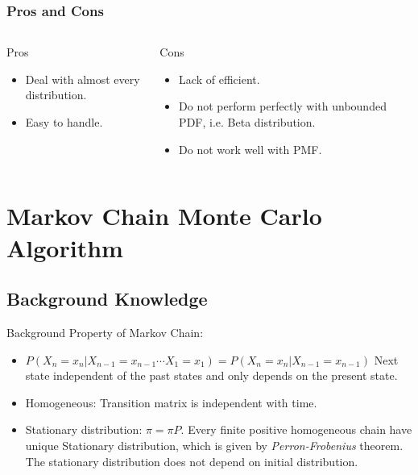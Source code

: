 \begin{frame}
    \frametitle{Pros and Cons}
    \begin{columns}
        \begin{block}{Pros}
            \begin{itemize}
                \item Deal with almost every distribution.
                \item Easy to handle.
            \end{itemize}
        \end{block}
        
        \begin{block}{Cons}
            \begin{itemize}
                \item Lack of efficient.
                \item Do not perform perfectly with unbounded PDF, i.e. Beta distribution.
                \item Do not work well with PMF.
            \end{itemize}
        \end{block}

        
    \end{columns}

    

\end{frame}

\section[MCMC]{Markov Chain Monte Carlo Algorithm}
\subsection{Background Knowledge}

\begin{frame}{Background}
    Property of Markov Chain:
    \begin{itemize}
        \item \(P(X_n = x_n |X_{n-1} = x_{n-1}\cdots X_{1} = x_1) = P(X_n = x_n |X_{n-1} = x_{n-1})\) Next state independent of the past states and only depends on the present state.
        \pause
        \item Homogeneous: Transition matrix is independent with time.
        \item Stationary distribution: \(\pi = \pi P\). Every finite positive homogeneous chain have unique Stationary distribution, which is given by \textit{Perron-Frobenius} theorem. The stationary distribution does not depend on initial distribution.
    \end{itemize}
\end{frame}

